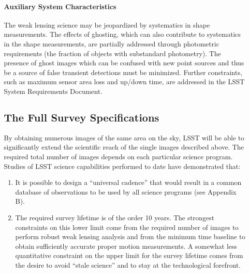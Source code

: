 \paragraph{Auxiliary System Characteristics\\}

The weak lensing science may be jeopardized by systematics in shape
measurements.
The effects of ghosting, which can also contribute to systematics in the
shape measurements, are partially addressed through photometric
requirements (\eg the fraction of objects with substandard photometry).
The presence of ghost images which can be confused with new point sources
and thus be a source of false transient detections must be minimized.
Further constraints, such as maximum sensor area loss and up/down time,
are addressed in the LSST System Requirements Document.

\subsection{          The Full Survey Specifications                   }


By obtaining numerous images of the same area on the sky, LSST will be able
to significantly extend the scientific reach of the single images described
above.  The required total number of images depends on each particular science
program.  Studies of LSST science capabilities performed to date have
demonstrated that:
\begin{enumerate}
\item It is possible to design a ``universal cadence'' that would result in
a common database of observations to be used by all science programs (see
Appendix B).
\item The required survey lifetime is of the order 10 years. The strongest
constraints on this lower limit come from the required number of images to
perform robust weak lensing analysis and from the minimum time baseline to
obtain sufficiently accurate proper motion measurements. A somewhat less
quantitative constraint on the upper limit for the survey lifetime comes
from the desire to avoid ``stale science'' and to stay at the
technological forefront.
\end{enumerate}

